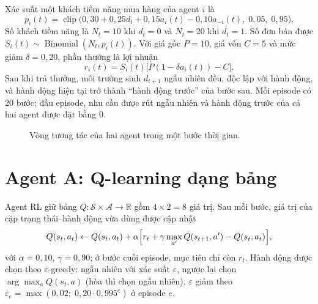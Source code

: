 \documentclass[12pt,a4paper]{report}
\begin{document}
Xác suất một khách tiềm năng mua hàng của agent $i$ là
\begin{equation}
p_i(t)=\operatorname{clip}\bigl(0{,}30+0{,}25d_t+0{,}15a_i(t)-0{,}10a_{-i}(t),\;0{,}05,\;0{,}95\bigr).
\label{eq:conv}
\end{equation}
Số khách tiềm năng là $N_t=10$ khi $d_t=0$ và $N_t=20$ khi $d_t=1$. Số đơn bán được
$S_i(t)\sim\operatorname{Binomial}(N_t,p_i(t))$. Với giá gốc $P=10$, giá vốn $C=5$
và mức giảm $\delta=0{,}20$, phần thưởng là lợi nhuận
\begin{equation}
r_i(t)=S_i(t)\bigl[P(1-\delta a_i(t))-C\bigr].
\label{eq:reward}
\end{equation}
Sau khi trả thưởng, môi trường sinh $d_{t+1}$ ngẫu nhiên đều, độc lập với hành động,
và hành động hiện tại trở thành ``hành động trước'' của bước sau. Mỗi episode có
20 bước; đầu episode, nhu cầu được rút ngẫu nhiên và hành động trước của cả hai
agent được đặt bằng 0.

\begin{figure}[H]
\centering
{}
\caption{Vòng tương tác của hai agent trong một bước thời gian.}
\label{fig:loop}
\end{figure}

\section{Agent A: Q-learning dạng bảng}
Agent RL giữ bảng $Q:\mathcal S\times\mathcal A\to\mathbb R$ gồm $4\times2=8$ giá trị.
Sau mỗi bước, giá trị của cặp trạng thái--hành động vừa dùng được cập nhật
\begin{equation}
Q(s_t,a_t)\leftarrow Q(s_t,a_t)+\alpha\Bigl[r_t+\gamma\max_{a'}Q(s_{t+1},a')-Q(s_t,a_t)\Bigr],
\label{eq:q}
\end{equation}
với $\alpha=0{,}10$, $\gamma=0{,}90$; ở bước cuối episode, mục tiêu chỉ còn $r_t$.
Hành động được chọn theo $\varepsilon$-greedy: ngẫu nhiên với xác suất
$\varepsilon$, ngược lại chọn $\arg\max_aQ(s_t,a)$ (hòa thì chọn ngẫu nhiên).
$\varepsilon$ giảm theo $\varepsilon_e=\max(0{,}02;\;0{,}20\cdot0{,}995^{e})$ ở episode $e$.
\end{document}
